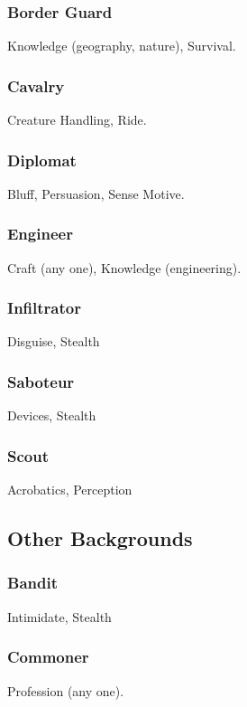 \subsubsection{Border Guard}
 Knowledge (geography, nature), Survival.

\subsubsection{Cavalry}
 Creature Handling, Ride.

\subsubsection{Diplomat}
 Bluff, Persuasion, Sense Motive.

\subsubsection{Engineer}
 Craft (any one), Knowledge (engineering).

\subsubsection{Infiltrator}
 Disguise, Stealth

\subsubsection{Saboteur}
 Devices, Stealth

\subsubsection{Scout}
 Acrobatics, Perception

\subsection{Other Backgrounds}

\subsubsection{Bandit}
 Intimidate, Stealth

\subsubsection{Commoner}
 Profession (any one).

